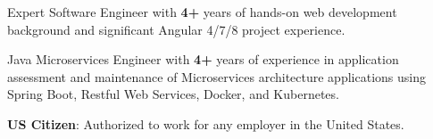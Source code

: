 \begin{cventries}
  \cventry
    {}
    {}
    {}
    {}
    {
      \vspace{-7mm}\begin{cvitems}
\item {Expert Software Engineer with \textbf{4+} years of hands-on web development background and significant Angular 4/7/8 project experience.}\vspace{1mm}\item {Java Microservices Engineer with \textbf{4+} years of experience in application assessment and maintenance of Microservices architecture applications using Spring Boot, Restful Web Services, Docker, and Kubernetes. }\vspace{1mm} 
\item { \textbf{US Citizen}: Authorized to work for any employer in the United States.}\vspace{1mm}
\end{cvitems}
    }
\end{cventries}
